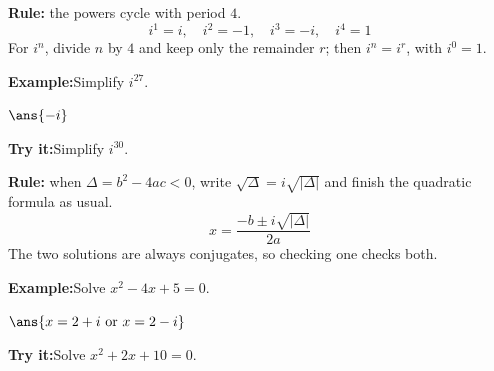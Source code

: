 \documentclass[12pt]{article}
\begin{document}
\begin{formulabox}
\textbf{Rule:} the powers cycle with period $4$.
\[ i^1 = i, \quad i^2 = -1, \quad i^3 = -i, \quad i^4 = 1 \]
For $i^n$, divide $n$ by $4$ and keep only the remainder $r$; then
$i^n = i^r$, with $i^0 = 1$.
\end{formulabox}
\begin{examplebox}
\textbf{Example:}\quad Simplify $i^{27}$.
\par
$\ans{-i}$
\end{examplebox}
\begin{tryitbox}
\textbf{Try it:}\quad Simplify $i^{30}$.\\[2pt]
\end{tryitbox}

\begin{formulabox}
\textbf{Rule:} when $\Delta = b^2 - 4ac < 0$, write
$\sqrt{\Delta} = i\sqrt{|\Delta|}$ and finish the quadratic formula as usual.
\[ x = \frac{-b \pm i\sqrt{|\Delta|}}{2a} \]
The two solutions are always conjugates, so checking one checks both.
\end{formulabox}
\begin{examplebox}
\textbf{Example:}\quad Solve $x^2 - 4x + 5 = 0$.
\par
$\ans{x=2+i \ \text{or} \ x=2-i}$
\end{examplebox}
\begin{tryitbox}
\textbf{Try it:}\quad Solve $x^2 + 2x + 10 = 0$.\\[2pt]
\end{tryitbox}
\end{document}
